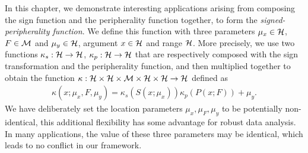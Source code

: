 In this chapter, we demonstrate interesting applications arising from composing the sign function and the peripherality function together, to form the {\it signed-peripherality function}. We define this function 
with three parameters $\mu_{x} \in {\cal{H}}$, $F \in {\cal{M}}$ and $\mu_{y} \in {\cal{H}}$,  argument $x \in {\cal{H}}$ and range ${\cal{H}}$. More precisely, we use two functions $\kappa_{s} : {\cal{H}} \rightarrow {\cal{H}}$, $\kappa_{p} : {\cal{H}} \rightarrow {\cal{H}}$ that are respectively composed with the sign transformation and the peripherality function, and 
then multiplied together to obtain the function $\kappa : {\cal{H}} \times {\cal{H}} \times {\cal{M}} \times {\cal{H}} \times {\cal{H}} \rightarrow {\cal{H}}$ defined as 
%
\begin{align}\label{eqn:kappaEqn}
\kappa (x; \mu_{x}, F, \mu_{y} ) = \kappa_{s} (S (x; \mu_{x})) \kappa_{p} (P (x; F)) + \mu_{y}. 
\end{align}
%
We have deliberately set the location parameters $\mu_{x}, \mu_{F}, \mu_{y}$ to be potentially non-identical, this additional flexibility has some advantage for robust data analysis. In many applications, the value of these three parameters may be identical, which leads to no conflict in our framework.

